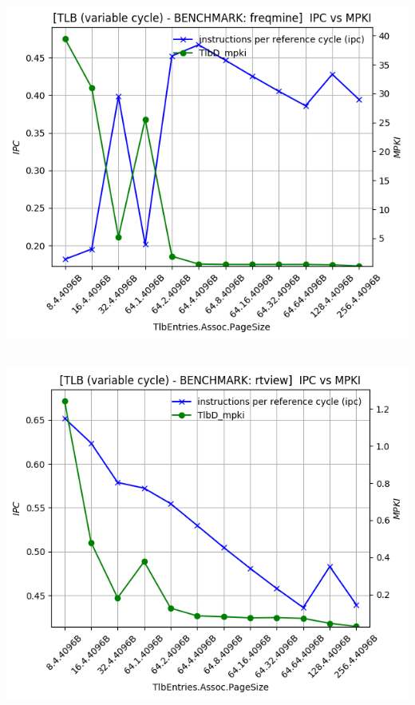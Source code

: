 \begin{minipage}{\textwidth}
    \begin{center}
        \\
        \vspace{3mm}
        \includegraphics[scale=0.65]{graphs/TLB/var/freqmine.png}
        \vspace{6mm}
    \end{center}
\end{minipage}

\begin{minipage}{\textwidth}
    \begin{center}
        \\
        \vspace{3mm}
        \includegraphics[scale=0.65]{graphs/TLB/var/rtview.png}
        \vspace{6mm}
    \end{center}
\end{minipage}

